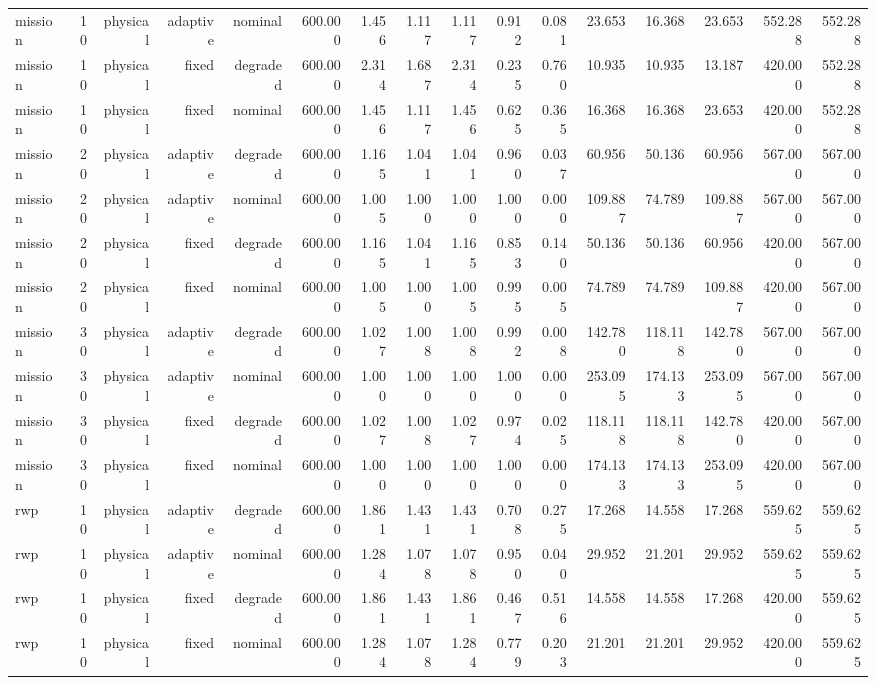 \begin{tabular}{lrrrrrrrrrrrrrrr}
mission & 10 & physical & adaptive & nominal & 600.000 & 1.456 & 1.117 & 1.117 & 0.912 & 0.081 & 23.653 & 16.368 & 23.653 & 552.288 & 552.288 \\
mission & 10 & physical & fixed & degraded & 600.000 & 2.314 & 1.687 & 2.314 & 0.235 & 0.760 & 10.935 & 10.935 & 13.187 & 420.000 & 552.288 \\
mission & 10 & physical & fixed & nominal & 600.000 & 1.456 & 1.117 & 1.456 & 0.625 & 0.365 & 16.368 & 16.368 & 23.653 & 420.000 & 552.288 \\
mission & 20 & physical & adaptive & degraded & 600.000 & 1.165 & 1.041 & 1.041 & 0.960 & 0.037 & 60.956 & 50.136 & 60.956 & 567.000 & 567.000 \\
mission & 20 & physical & adaptive & nominal & 600.000 & 1.005 & 1.000 & 1.000 & 1.000 & 0.000 & 109.887 & 74.789 & 109.887 & 567.000 & 567.000 \\
mission & 20 & physical & fixed & degraded & 600.000 & 1.165 & 1.041 & 1.165 & 0.853 & 0.140 & 50.136 & 50.136 & 60.956 & 420.000 & 567.000 \\
mission & 20 & physical & fixed & nominal & 600.000 & 1.005 & 1.000 & 1.005 & 0.995 & 0.005 & 74.789 & 74.789 & 109.887 & 420.000 & 567.000 \\
mission & 30 & physical & adaptive & degraded & 600.000 & 1.027 & 1.008 & 1.008 & 0.992 & 0.008 & 142.780 & 118.118 & 142.780 & 567.000 & 567.000 \\
mission & 30 & physical & adaptive & nominal & 600.000 & 1.000 & 1.000 & 1.000 & 1.000 & 0.000 & 253.095 & 174.133 & 253.095 & 567.000 & 567.000 \\
mission & 30 & physical & fixed & degraded & 600.000 & 1.027 & 1.008 & 1.027 & 0.974 & 0.025 & 118.118 & 118.118 & 142.780 & 420.000 & 567.000 \\
mission & 30 & physical & fixed & nominal & 600.000 & 1.000 & 1.000 & 1.000 & 1.000 & 0.000 & 174.133 & 174.133 & 253.095 & 420.000 & 567.000 \\
rwp & 10 & physical & adaptive & degraded & 600.000 & 1.861 & 1.431 & 1.431 & 0.708 & 0.275 & 17.268 & 14.558 & 17.268 & 559.625 & 559.625 \\
rwp & 10 & physical & adaptive & nominal & 600.000 & 1.284 & 1.078 & 1.078 & 0.950 & 0.040 & 29.952 & 21.201 & 29.952 & 559.625 & 559.625 \\
rwp & 10 & physical & fixed & degraded & 600.000 & 1.861 & 1.431 & 1.861 & 0.467 & 0.516 & 14.558 & 14.558 & 17.268 & 420.000 & 559.625 \\
rwp & 10 & physical & fixed & nominal & 600.000 & 1.284 & 1.078 & 1.284 & 0.779 & 0.203 & 21.201 & 21.201 & 29.952 & 420.000 & 559.625 \\

\end{tabular}
